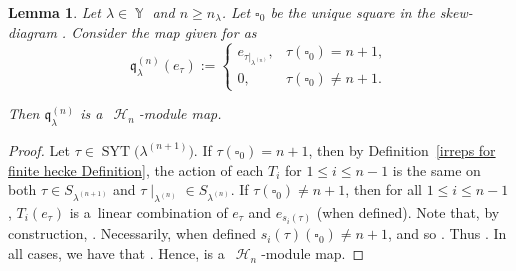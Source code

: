 \documentclass[pdftex]{sigma}
\numberwithin{equation}{section}
\newtheorem{Lemma}[Theorem]{Lemma}
\theoremstyle{definition}
\DeclareMathOperator{\Par}{\mathbb{Y}}
\DeclareMathOperator{\SYT}{\mathrm{SYT}}
\DeclareMathOperator{\sH}{\mathscr{H}}
\begin{document}
\begin{Lemma}\label{finite hecke map}
 Let $\lambda \in \Par$ and $n \geq n_{\lambda}$. Let $\square_0$ be the unique square in the skew-diagram . Consider the map  given for \smash{$\tau \in \SYT\bigl(\lambda^{(n+1)}\bigr)$} as
 \[
 \mathfrak{q}_{\lambda}^{(n)}(e_{\tau}) := \begin{cases}
 e_{\tau|_{\lambda^{(n)}}}, & \tau(\square_0) = n+1,\\
 0, & \tau(\square_0) \neq n+1.
 \end{cases}
 \]

 Then $\mathfrak{q}_{\lambda}^{(n)}$ is a~$\sH_{n}$-module map.
\end{Lemma}
\begin{proof}
Let $\tau \in \SYT\bigl(\lambda^{(n+1)}\bigr)$. If $\tau(\square_0) = n+1$, then by Definition~\ref{irreps for finite hecke Definition}, the action of each $T_i$ for $1\leq i \leq n-1$ is the same on both $\tau \in S_{\lambda^{(n+1)}}$ and $\tau\mid _{\lambda^{(n)}} \in S_{\lambda^{(n)}}$. If $\tau(\square_0) \neq n+1$, then for all $1\leq i \leq n-1$, $T_i(e_{\tau})$ is a~linear combination of $e_{\tau}$ and $e_{s_i(\tau)}$ (when defined). Note that, by construction, . Necessarily, when defined $s_i(\tau)(\square_0) \neq n+1$, and so . Thus . In all cases, we have that . Hence,  is a~$\sH_n$-module map.
\end{proof}
\end{document}
